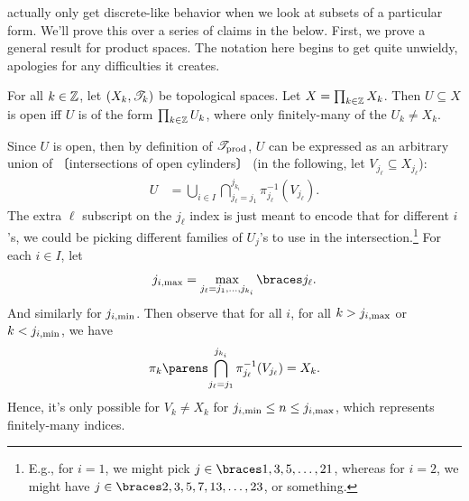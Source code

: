 \documentclass{fkpaper}
\newcommand{\np}[1]{\hspace{-.55em}〔#1〕\hspace{-.55em}}
\begin{document}
\begin{multicols}{2}
  actually only get discrete-like behavior when we look at subsets of a
  particular form. We'll prove this over a series of claims in the
  below. First, we prove a general result for product spaces. The
  notation here begins to get quite unwieldy, apologies for any
  difficulties it creates.
  \begin{proposition}\label{prop:openness-in-products}
    For all $k \in \mathbb{Z}$, let $(X_k, {\mathscr{T}}_k)$ be topological spaces. Let
    $X = \prod_{k \in \mathbb{Z}} X_k$. Then $U \subseteq X$ is open iff $U$ is
    of the form $\prod_{k \in \mathbb{Z}} U_k$, where only finitely-many of the
    $U_k \neq X_k$.
  \end{proposition}
  \begin{sproof}
    Since $U$ is open, then by definition of ${\mathscr{T}}_{\rm prod}$, $U$
    can be expressed as an arbitrary union of \np{intersections of
      open cylinders} (in the following, let $V_{j_\ell} \subseteq
    X_{j_\ell}$):
    \begin{align*}
      U %
        &= \bigcup_{i \in I} \bigcap_{j_\ell = j_1}^{j_{k_i}}
          \pi_{j_\ell}^{-1}(V_{j_\ell}).
    \end{align*}
    The extra $\ell$ subscript on the $j_\ell$ index is just meant to encode
    that for different $i$'s, we could be picking different families of
    $U_j$'s to use in the intersection.\footnote{E.g., for $i = 1$, we
      might pick $j \in \set{1, 3, 5, \ldots, 21}$, whereas for $i = 2$,
      we might have $j \in \set{2, 3, 5, 7, 13, \ldots, 23}$, or
      something.} For each $i \in I$, let
    \[
      j_{i, {\rm max}} = \max_{j_\ell = j_1, \ldots, j_{k_i}} \set{j_\ell}.
    \]
    And similarly for $j_{i, {\rm min}}$. Then observe that for all $i$,
    for all $k > j_{i, {\rm max}}$ or $k < j_{i, {\rm min}}$, we have
    \[
      \pi_{k} \pn{\bigcap_{j_\ell = j_1}^{j_{k_i}}
        \pi_{j_\ell}^{-1}(V_{j_\ell})} = X_{k}.
    \]
    Hence, it's only possible for $V_k \neq X_k$ for $j_{i, {\rm
        min}}\leq n \leq j_{i, {\rm max}}$, which represents
    finitely-many indices.


\end{sproof}
\end{multicols}
\end{document}
